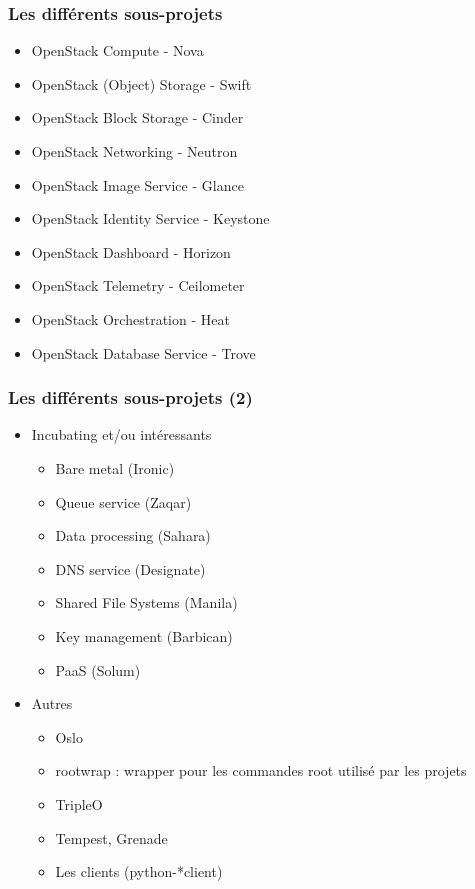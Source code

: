   \begin{frame}
    \frametitle{Les différents sous-projets}
    \begin{itemize}
        \item OpenStack Compute - Nova
        \item OpenStack (Object) Storage - Swift\pause
        \item OpenStack Block Storage - Cinder\pause
        \item OpenStack Networking - Neutron\pause
        \item OpenStack Image Service - Glance\pause
        \item OpenStack Identity Service - Keystone\pause
        \item OpenStack Dashboard - Horizon\pause
        \item OpenStack Telemetry - Ceilometer\pause
        \item OpenStack Orchestration - Heat\pause
        \item OpenStack Database Service - Trove
    \end{itemize}
  \end{frame}

  \begin{frame}
    \frametitle{Les différents sous-projets (2)}
    \begin{itemize}
      \item Incubating et/ou intéressants
      \begin{itemize}
        \item Bare metal (Ironic)
        \item Queue service (Zaqar)
        \item Data processing (Sahara)
        \item DNS service (Designate)
        \item Shared File Systems (Manila)
        \item Key management (Barbican)
        \item PaaS (Solum)
      \end{itemize}\pause
      \item Autres
      \begin{itemize}
        \item Oslo
        \item rootwrap : wrapper pour les commandes root utilisé par les projets
        \item TripleO
        \item Tempest, Grenade
        \item Les clients (python-*client)
      \end{itemize}
    \end{itemize}
  \end{frame}

